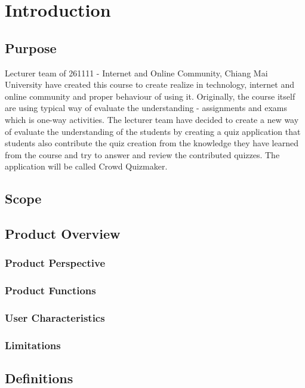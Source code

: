 \documentclass[ 10pt]{report}
\begin{document}
    \chapter{Introduction}
        \section{Purpose}
        Lecturer team of 261111 - Internet and Online Community, Chiang Mai University have created this course to create realize in technology, internet and online community and proper behaviour of using it. Originally, the course itself are using typical way of evaluate the understanding - assignments and exams which is one-way activities. The lecturer team have decided to create a new way of evaluate the understanding of the students by creating a quiz application that students also contribute the quiz creation from the knowledge they have learned from the course and try to answer and review the contributed quizzes. The application will be called Crowd Quizmaker.
        \section{Scope}
        \section{Product Overview}
            \subsection{Product Perspective}
            \subsection{Product Functions}
            \subsection{User Characteristics}
            \subsection{Limitations}
        \section{Definitions}
    \pagebreak
\end{document}

